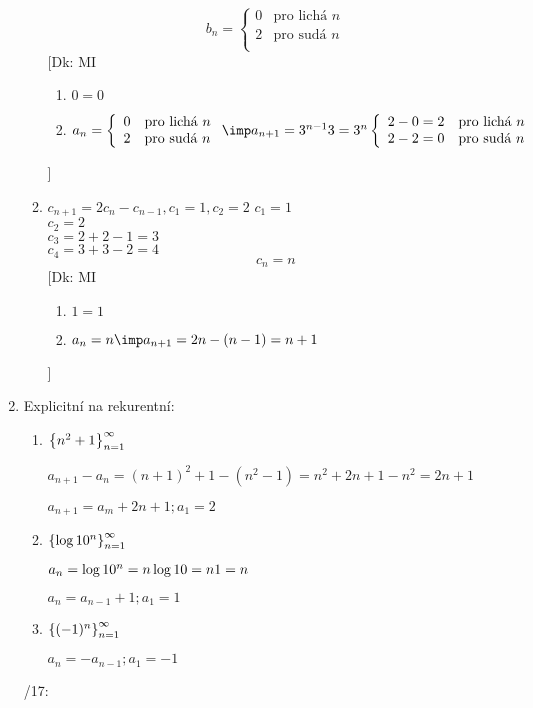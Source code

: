 \begin{enumerate}
\begin{enumerate}
				$$b_n=
				\left\{\begin{array}{ll} 
					0 & \text{pro lichá $n$}\\
					2 & \text{pro sudá $n$}\\
				\end{array}\right.
				$$
				[Dk: MI
				\begin{enumerate}
					\item $0=0$
					\item $a_n = 
				\left\{\begin{array}{ll} 
					0 & \text{pro lichá $n$}\\
					2 & \text{pro sudá $n$}\\
				\end{array}\right.
						\imp a_{n+1} = 3^{n-1}\*3=3^{n}
				\left\{\begin{array}{ll} 
					2-0=2 & \text{pro lichá $n$}\\
					2-2=0 & \text{pro sudá $n$}\\
				\end{array}\right.$
				\end{enumerate}
				]
			\item $c_{n+1} = 2c_n-c_{n-1},c_1=1,c_2=2$
				$c_1=1$\\
				$c_2=2$\\
				$c_3=2+2-1=3$\\
				$c_4=3+3-2=4$
				$$c_n=n$$
				[Dk: MI
				\begin{enumerate}
					\item $1=1$
					\item $a_n = n \imp a_{n+1} = 2n-(n-1)=n+1$
				\end{enumerate}
				]
		\end{enumerate}
	\item Explicitní na rekurentní:
		\begin{enumerate}
			\item 
			$\left\{{n^2+1}\right\}_{n=1}^\infty$

				$a_{n+1} - a_n = (n+1)^2+1 -(n^2-1) = n^2+2n+1-n^2 = 2n+1$

				$a_{n+1} = a_m + 2n +1;a_1=2$
			\item
			$\left\{{\log 10^n}\right\}_{n=1}^\infty$

				$a_n = \log 10^n = n \log 10 = n\*1 = n$

				$a_n=a_{n-1}+1;a_1=1$
			\item
				$\left\{{(-1)^n}\right\}_{n=1}^\infty$

				$a_n = - a_{n-1};a_1=-1$

		\end{enumerate}
	/17:


\end{enumerate}
